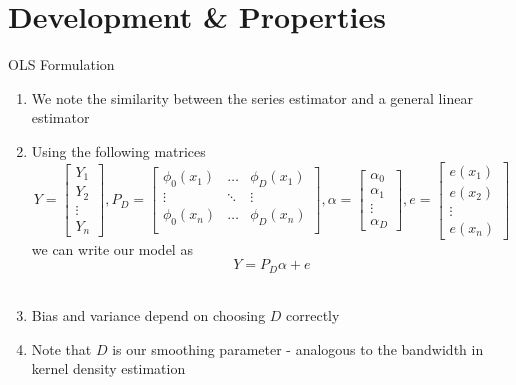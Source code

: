\documentclass{beamer}
\begin{document}
\section{Development \& Properties}
\begin{frame}{OLS Formulation}%
\begin{enumerate}
\item We note the similarity between the series estimator and a general linear estimator\pause 
\item Using the following matrices
$$Y = \begin{bmatrix}Y_1\\ Y_2\\\vdots\\Y_n\end{bmatrix}, P_D = \begin{bmatrix}\phi_0(x_1) & \ldots & \phi_{D}(x_1)\\\vdots & \ddots & \vdots \\\phi_0(x_n) & \ldots & \phi_{D}(x_n)\\\end{bmatrix}, \alpha = \begin{bmatrix}\alpha_0\\\alpha_1 \\\vdots\\\alpha_D\end{bmatrix}, e =\begin{bmatrix}e(x_1)\\e(x_2)\\\vdots\\e(x_n)\end{bmatrix}$$
we can write our model as $$Y = P_D\alpha + e$$\\
\item Bias and variance depend on choosing $D$ correctly
\item Note that $D$ is our smoothing parameter - analogous to the bandwidth in kernel density estimation 
\end{enumerate}
\end{frame}
\end{document}
